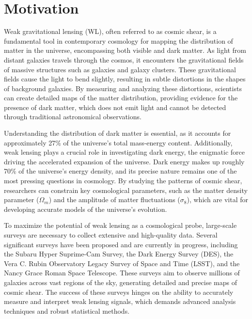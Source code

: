 \section{Motivation}
Weak gravitational lensing (WL), often referred to as cosmic shear, is a fundamental tool in contemporary cosmology for mapping the distribution of matter in the universe, encompassing both visible and dark matter. As light from distant galaxies travels through the cosmos, it encounters the gravitational fields of massive structures such as galaxies and galaxy clusters. These gravitational fields cause the light to bend slightly, resulting in subtle distortions in the shapes of background galaxies. By measuring and analyzing these distortions, scientists can create detailed maps of the matter distribution, providing evidence for the presence of dark matter, which does not emit light and cannot be detected through traditional astronomical observations.

Understanding the distribution of dark matter is essential, as it accounts for approximately 27\% of the universe's total mass-energy content. Additionally, weak lensing plays a crucial role in investigating dark energy, the enigmatic force driving the accelerated expansion of the universe. Dark energy makes up roughly 70\% of the universe's energy density, and its precise nature remains one of the most pressing questions in cosmology. By studying the patterns of cosmic shear, researchers can constrain key cosmological parameters, such as the matter density parameter ($\Omega_m$) and the amplitude of matter fluctuations ($\sigma_8$), which are vital for developing accurate models of the universe's evolution.

To maximize the potential of weak lensing as a cosmological probe, large-scale surveys are necessary to collect extensive and high-quality data. Several significant surveys have been proposed and are currently in progress, including the Subaru Hyper Suprime-Cam Survey, the Dark Energy Survey (DES), the Vera C. Rubin Observatory Legacy Survey of Space and Time (LSST), and the Nancy Grace Roman Space Telescope. These surveys aim to observe millions of galaxies across vast regions of the sky, generating detailed and precise maps of cosmic shear. The success of these surveys hinges on the ability to accurately measure and interpret weak lensing signals, which demands advanced analysis techniques and robust statistical methods.

